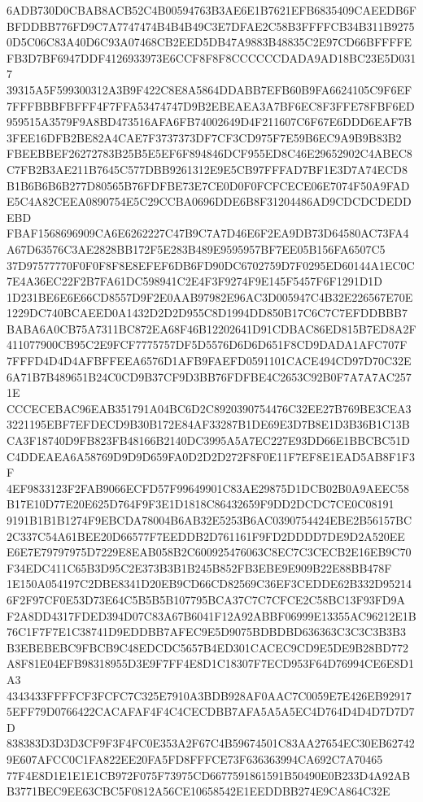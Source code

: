 \documentclass[UTF8,fontset=fandol,zihao=-4,a4paper]{ctexart}
\begin{document}
{{6ADB730D0CBAB8ACB52C4B00594763B3AE6E1B7621EFB6835409CAEEDB6FBFDDBB776FD9C7A7747474B4B4B49C3E7DFAE2C58B3FFFFCB34B311B9275
0D5C06C83A40D6C93A07468CB2EED5DB47A9883B48835C2E97CD66BFFFFEFB3D7BF6947DDF4126933973E6CCF8F8F8CCCCCCDADA9AD18BC23E5D0317
39315A5F599300312A3B9F422C8E8A5864DDABB7EFB60B9FA6624105C9F6EF7FFFBBBFBFFF4F7FFA53474747D9B2EBEAEA3A7BF6EC8F3FFE78FBF6ED
959515A3579F9A8BD473516AFA6FB74002649D4F211607C6F67E6DDD6EAF7B3FEE16DFB2BE82A4CAE7F3737373DF7CF3CD975F7E59B6EC9A9B9B83B2
FBEEBBEF26272783B25B5E5EF6F894846DCF955ED8C46E29652902C4ABEC8C7FB2B3AE211B7645C577DBB9261312E9E5CB97FFFAD7BF1E3D7A74ECD8
B1B6B6B6B277D80565B76FDFBE73E7CE0D0F0FCFCECE06E7074F50A9FADE5C4A82CEEA0890754E5C29CCBA0696DDE6B8F31204486AD9CDCDCDEDDEBD
FBAF1568696909CA6E6262227C47B9C7A7D46E6F2EA9DB73D64580AC73FA4A67D63576C3AE2828BB172F5E283B489E9595957BF7EE05B156FA6507C5
37D97577770F0F0F8F8E8EFEF6DB6FD90DC6702759D7F0295ED60144A1EC0C7E4A36EC22F2B7FA61DC598941C2E4F3F9274F9E145F5457F6F1291D1D
1D231BE6E6E66CD8557D9F2E0AAB97982E96AC3D005947C4B32E226567E70E1229DC740BCAEED0A1432D2D2D955C8D1994DD850B17C6C7C7EFDDBBB7
BABA6A0CB75A7311BC872EA68F46B12202641D91CDBAC86ED815B7ED8A2F411077900CB95C2E9FCF7775757DF5D5576D6D6D651F8CD9DADA1AFC707F
7FFFD4D4D4AFBFFEEA6576D1AFB9FAEFD0591101CACE494CD97D70C32E6A71B7B489651B24C0CD9B37CF9D3BB76FDFBE4C2653C92B0F7A7A7AC2571E
CCCECEBAC96EAB351791A04BC6D2C8920390754476C32EE27B769BE3CEA33221195EBF7EFDECD9B30B172E84AF33287B1DE69E3D7B8E1D3B36B1C13B
CA3F18740D9FB823FB48166B2140DC3995A5A7EC227E93DD66E1BBCBC51DC4DDEAEA6A58769D9D9D659FA0D2D2D272F8F0E11F7EF8E1EAD5AB8F1F3F
4EF9833123F2FAB9066ECFD57F99649901C83AE29875D1DCB02B0A9AEEC58B17E10D77E20E625D764F9F3E1D1818C86432659F9DD2DCDC7CE0C08191
9191B1B1B1274F9EBCDA78004B6AB32E5253B6AC0390754424EBE2B56157BC2C337C54A61BEE20D66577F7EEDDB2D761161F9FD2DDDD7DE9D2A520EE
E6E7E79797975D7229E8EAB058B2C600925476063C8EC7C3CECB2E16EB9C70F34EDC411C65B3D95C2E373B3B1B245B852FB3EBE9E909B22E88BB478F
1E150A054197C2DBE8341D20EB9CD66CD82569C36EF3CEDDE62B332D952146F2F97CF0E53D73E64C5B5B5B107795BCA37C7C7CFCE2C58BC13F93FD9A
F2A8DD4317FDED394D07C83A67B6041F12A92ABBF06999E13355AC96212E1B76C1F7F7E1C38741D9EDDBB7AFEC9E5D9075BDBDBD636363C3C3C3B3B3
B3EBEBEBC9FBCB9C48EDCDC5657B4ED301CACEC9CD9E5DE9B28BD772A8F81E04EFB98318955D3E9F7FF4E8D1C18307F7ECD953F64D76994CE6E8D1A3
4343433FFFFCF3FCFC7C325E7910A3BDB928AF0AAC7C0059E7E426EB929175EFF79D0766422CACAFAF4F4C4CECDBB7AFA5A5A5EC4D764D4D4D7D7D7D
838383D3D3D3CF9F3F4FC0E353A2F67C4B59674501C83AA27654EC30EB627429E607AFCC0C1FA822EE20FA5FD8FFFCE73F636363994CA692C7A70465
77F4E8D1E1E1E1CB972F075F73975CD6677591861591B50490E0B233D4A92ABB3771BEC9EE63CBC5F0812A56CE10658542E1EEDDBB274E9CA864C32E
}}
\end{document}
